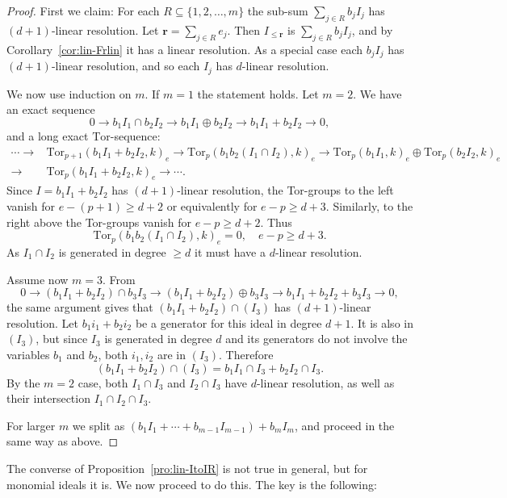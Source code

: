 \documentclass[10pt,a4paper]{article}
\theoremstyle{definition}
\theoremstyle{remark}
\theoremstyle{plain}
\newcommand{\Tor}{\text{Tor}}
\newcommand{\sus}{\subseteq}
\newcommand{\pil}{\rightarrow}
\newcommand{\bfr}{{\mathbf r}}
\begin{document}
\begin{proof}
  First we claim: For each   $R \sus \{1,2, \ldots, m\}$
  the sub-sum  $\sum_{j \in R} b_j I_j$ has $(d+1)$-linear resolution.
  Let $\bfr = \sum_{j \in R} e_j $. Then $I_{\leq \bfr}$ is 
 $\sum_{j \in R} b_j I_j$, and by Corollary~\ref{cor:lin-Frlin}
it has a linear resolution. 
As a special case each  $b_j I_j$ has $(d+1)$-linear
resolution, and so each $I_j$ has $d$-linear resolution.


We now use induction on $m$. If $m = 1$ the statement holds.
Let $m = 2$. We have
an exact sequence
\[ 0 \pil b_1 I_1 \cap b_2I_2 \pil b_1I_1 \oplus b_2I_2 \pil
b_1 I_1 + b_2 I_2 \pil 0, \]
and a long exact $\Tor$-sequence:
{\small \begin{align*}  \cdots \pil & \Tor_{p+1}(b_1I_1 + b_2 I_2, k)_e \pil
  \Tor_{p}(b_1b_2 (I_1 \cap I_2), k)_e \pil \Tor_p(b_1I_1,k)_e \oplus
                           \Tor_p(b_2I_2,k)_e \\
  \pil & \Tor_{p}(b_1I_1 + b_2 I_2, k)_e \pil \cdots .
\end{align*}}Since $I = b_1I_1 + b_2 I_2$ has $(d+1)$-linear resolution, the Tor-groups
to the left vanish for $e - (p+1) \geq d+2$ or equivalently for $e-p \geq d+3$.
Similarly, to the right above the Tor-groups vanish for $e-p \geq d+2$.
Thus
\[ \Tor_{p}(b_1b_2 (I_1 \cap I_2), k)_e = 0, \quad e-p \geq d+3.\]
As $I_1 \cap I_2$ is generated in degree $\geq d$ it must have a
$d$-linear resolution.

Assume now $m = 3$. From
\[ 0 \pil (b_1 I_1 +  b_2I_2) \cap b_3I_3 \pil (b_1I_1 + b_2I_2)
  \oplus b_3 I_3 \pil
b_1 I_1 + b_2 I_2 + b_3I_3 \pil 0, \]
the same argument gives that $(b_1I_1 + b_2 I_2) \cap (I_3)$ has
$(d+1)$-linear resolution. Let $b_1 i_1 + b_2 i_2$ be a generator for
this ideal in degree $d+1$. It is also in $(I_3)$, but since $I_3$ is generated
in degree $d$ and its generators do not involve the variables $b_1$ and $b_2$,
both $i_1, i_2 $ are in $(I_3)$. 
Therefore
\[ (b_1 I_1 + b_2I_2) \cap (I_3) = b_1 I_1 \cap I_3 + b_2 I_2 \cap I_3. \]
By the $m = 2$ case, both $I_1 \cap I_3$ and $I_2 \cap I_3$ have
$d$-linear resolution, as well as their intersection $I_1 \cap I_2 \cap I_3$.

For larger $m$ we split as $(b_1I_1 + \cdots + b_{m-1}I_{m-1}) + b_mI_m$, and
proceed in the same way as above.
\end{proof}

The converse of Proposition~\ref{pro:lin-ItoIR} is not true
in general, but for monomial ideals it is.
We now proceed to do this. The key is the following:
\end{document}

